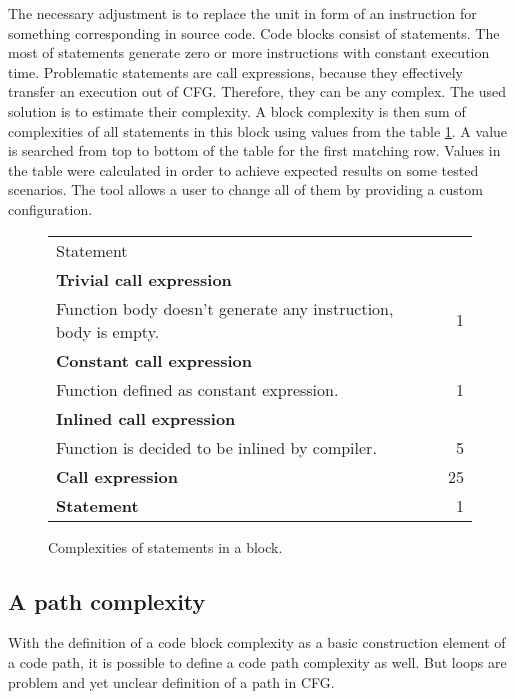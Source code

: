 The necessary adjustment is to replace the unit in form of an instruction for something corresponding in source code. Code blocks consist of statements. The most of statements generate zero or more instructions with constant execution time. Problematic statements are call expressions, because they effectively transfer an execution out of CFG. Therefore, they can be any complex. The used solution is to estimate their complexity. A block complexity is then sum of complexities of all statements in this block using values from the table \ref{yield-block}. A value is searched from top to bottom of the table for the first matching row. Values in the table were calculated in order to achieve expected results on some tested scenarios. The tool allows a user to change all of them by providing a custom configuration.

\begin{figure}[h!]
\caption{Complexities of statements in a block.}
\label{yield-block}
\vspace{0.5cm}
\renewcommand{\arraystretch}{1.1}
\centering
\begin{tabular}{ l | r }
  \cellcolor[gray]{0.9}Statement & \cellcolor[gray]{0.9} \\
  \textbf{Trivial call expression}\\Function body doesn't generate any instruction, body is empty. & 1 \\
  \textbf{Constant call expression}\\Function defined as constant expression. & 1 \\
  \textbf{Inlined call expression}\\Function is decided to be inlined by compiler. & 5 \\
  \cellcolor[gray]{0.9}\textbf{Call expression} & \cellcolor[gray]{0.9}25 \\
  \cellcolor[gray]{0.9}\textbf{Statement} & \cellcolor[gray]{0.9}1 \\
\end{tabular}
\end{figure}

\subsection{A path complexity}
With the definition of a code block complexity as a basic construction element of a code path, it is possible to define a code path complexity as well. But loops are problem and yet unclear definition of a path in CFG.

